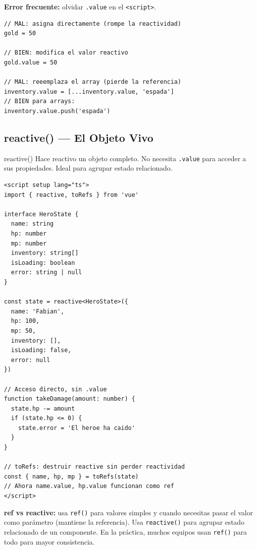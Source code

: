 \documentclass[11pt,a4paper]{article}
\begin{document}
\begin{trampa}
\textbf{Error frecuente:} olvidar \texttt{.value} en el \texttt{<script>}.
\begin{lstlisting}[style=vue,numbers=none]
// MAL: asigna directamente (rompe la reactividad)
gold = 50

// BIEN: modifica el valor reactivo
gold.value = 50

// MAL: reeemplaza el array (pierde la referencia)
inventory.value = [...inventory.value, 'espada']
// BIEN para arrays:
inventory.value.push('espada')
\end{lstlisting}
\end{trampa}

\subsection{reactive() — El Objeto Vivo}

\begin{hechizo}{reactive()}
Hace reactivo un objeto completo. No necesita \texttt{.value} para
acceder a sus propiedades. Ideal para agrupar estado relacionado.
\end{hechizo}

\begin{pergamino}
\begin{lstlisting}[style=vue]
<script setup lang="ts">
import { reactive, toRefs } from 'vue'

interface HeroState {
  name: string
  hp: number
  mp: number
  inventory: string[]
  isLoading: boolean
  error: string | null
}

const state = reactive<HeroState>({
  name: 'Fabian',
  hp: 100,
  mp: 50,
  inventory: [],
  isLoading: false,
  error: null
})

// Acceso directo, sin .value
function takeDamage(amount: number) {
  state.hp -= amount
  if (state.hp <= 0) {
    state.error = 'El heroe ha caido'
  }
}

// toRefs: destruir reactive sin perder reactividad
const { name, hp, mp } = toRefs(state)
// Ahora name.value, hp.value funcionan como ref
</script>
\end{lstlisting}
\end{pergamino}

\begin{cofre}
\textbf{ref vs reactive:} usa \texttt{ref()} para valores simples y
cuando necesitas pasar el valor como parámetro (mantiene la referencia).
Usa \texttt{reactive()} para agrupar estado relacionado de un componente.
En la práctica, muchos equipos usan \texttt{ref()} para todo para mayor
consistencia.
\end{cofre}
\end{document}
